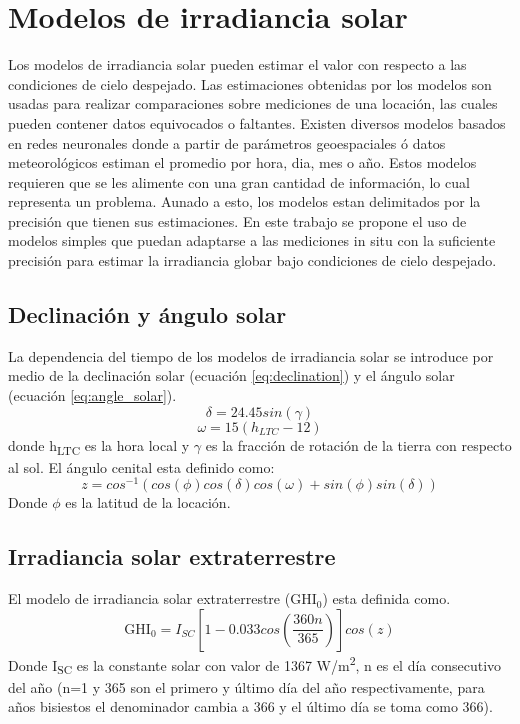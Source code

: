 \section{Modelos de irradiancia solar}
Los modelos de irradiancia solar pueden estimar el valor con respecto a las condiciones de cielo despejado\cite{Gueymard_2012,Perez_Burgos_2017,Ineichen_2016}. Las estimaciones obtenidas por los modelos son usadas para realizar comparaciones sobre mediciones de una locación, las cuales pueden contener datos equivocados o faltantes. Existen diversos modelos basados en redes neuronales donde a partir de parámetros geoespaciales ó datos meteorológicos estiman el promedio por hora, dia, mes o año\cite{Hasni_2012,Kumar_2019,Ozgoren_2012,Sahan_2016}. Estos modelos requieren que se les alimente con una gran cantidad de información, lo cual representa un problema. Aunado a esto, los modelos estan delimitados por la precisión que tienen sus estimaciones\cite{Ruiz_Arias_2018}. En este trabajo se propone el uso de modelos simples que puedan adaptarse a las mediciones in situ con la suficiente precisión para estimar la irradiancia globar bajo condiciones de cielo despejado.
\subsection{Declinación y ángulo solar}
La dependencia del tiempo de los modelos de irradiancia solar se introduce por medio de la declinación solar (ecuación \ref{eq:declination}) y el ángulo solar (ecuación \ref{eq:angle_solar}).
\begin{equation}
	\delta = 24.45 sin(\gamma)
	\label{eq:declination}
\end{equation}
\begin{equation}
	\omega = 15(h_{LTC}-12)
	\label{eq:angle_solar}
\end{equation}
donde h\textsubscript{LTC} es la hora local y $\gamma$ es la fracción de rotación de la tierra con respecto al sol. El ángulo cenital esta definido como:
\begin{equation*}
	z = cos^{-1}(cos(\phi)cos(\delta)cos(\omega)+sin(\phi)sin(\delta))
\end{equation*}
Donde $\phi$ es la latitud de la locación.
\subsection{Irradiancia solar extraterrestre}
El modelo de irradiancia solar extraterrestre (GHI$_0$) esta definida como\cite{Muhammad_1983}.
\begin{equation}
	\text{GHI}_0 = I_{SC}\left[ 1-0.033 cos\left( \frac{360n}{365}  \right)\right] cos(z)  \label{eq:GHI0}
\end{equation}
Donde I\textsubscript{SC} es la constante solar con valor de 1367 W/m\textsuperscript{2}, n es el día consecutivo del año (n=1 y 365 son el primero y último día del año respectivamente, para años bisiestos el denominador cambia a 366 y el último día se toma como 366).
